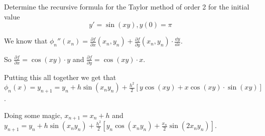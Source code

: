 \documentclass[../diffeq.tex]{subfiles}
\begin{document}
\pagebreak
\begin{example}
    Determine the recursive formula for the Taylor method of order 2 for the initial value 
    \[ y'=\sin(xy), y(0)=\pi \]

    We know that $\phi_n''(x_n)=\frac{\partial f}{\partial x}(x_n,y_n)+\frac{\partial f}{\partial y}(x_n,y_n)\cdot \frac{\dd y}{\dd x}$.

    So $\frac{\partial f}{\partial x}=\cos(xy)\cdot y$ and $\frac{\partial f}{\partial y}=\cos(xy)\cdot x$. 

    Putting this all together we get that $\phi_n(x)=y_{n+1}=y_n+h\sin(x_ny_n)+\frac{h^2}{2}[y\cos(xy)+x\cos(xy)\cdot \sin(xy)]$.

    Doing some magic, $x_{n+1}=x_n+h$ and $y_{n+1}=y_n+h\sin(x_ny_n)+\frac{h^2}{2}[y_n\cos(x_ny_n)+\frac{x_n}{2}\sin(2x_ny_n)]$. 
\end{example}
\end{document}
